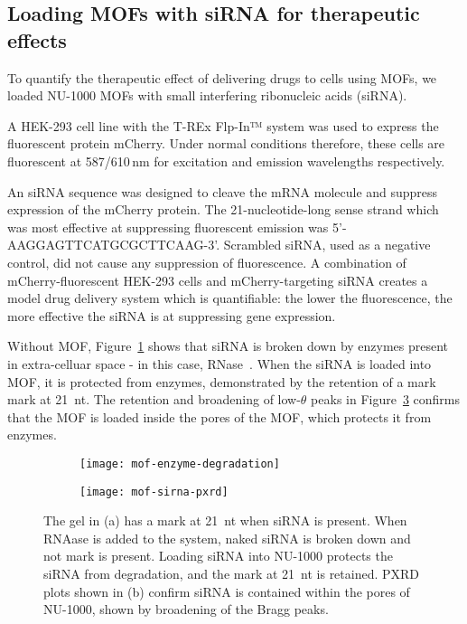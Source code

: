 \subsection{Loading MOFs with siRNA for therapeutic effects} \label{sec:MOF-siRNA}
To quantify the therapeutic effect of delivering drugs to cells using MOFs, we loaded NU-1000 MOFs with small interfering ribonucleic acids (siRNA). 

A HEK-293 cell line with the T-REx Flp-In™ system was used to express the fluorescent protein mCherry. 
Under normal conditions therefore, these cells are fluorescent at 587/610\,\si{\nano\meter} for excitation and emission wavelengths respectively. 

An siRNA sequence was designed to cleave the mRNA molecule and suppress expression of the mCherry protein.
The 21-nucleotide-long sense strand which was most effective at suppressing fluorescent emission was 5'-AAGGAGTTCATGCGCTTCAAG-3'. 
Scrambled siRNA, used as a negative control, did not cause any suppression of fluorescence.
A combination of mCherry-fluorescent HEK-293 cells and mCherry-targeting siRNA creates a model drug delivery system which is quantifiable: the lower the fluorescence, the more effective the siRNA is at suppressing gene expression. 

Without MOF, Figure~\ref{fig:mof-enzyme-degradation} shows that siRNA is broken down by enzymes present in extra-celluar space - in this case, RNase~\cite{chirgwin1979isolation}.
When the siRNA is loaded into MOF, it is protected from enzymes, demonstrated by the retention of a mark mark at \SI{21}{nt}. 
The retention and broadening of low-$\theta$ peaks in Figure~\ref{fig:mof-enzyme-pxrd} confirms that the MOF is loaded inside the pores of the MOF, which protects it from enzymes. 

\begin{figure}[htbp!]
	\centering
	\begin{subfigure}[b]{0.49\textwidth}
		\texttt{[image: mof-enzyme-degradation]}
		\caption{} \label{fig:mof-enzyme-degradation}
	\end{subfigure}
	\hfill
	\begin{subfigure}[b]{0.49\textwidth}
		\texttt{[image: mof-sirna-pxrd]}
		\caption{} \label{fig:mof-sirna-pxrd}
	\end{subfigure}			
	\caption[MOFs: NU-1000 protects siRNA from degradation by enzymes in extracellular space]{The gel in (a) has a mark at \SI{21}{nt} when siRNA is present. When RNAase is added to the system, naked siRNA is broken down and not mark is present. Loading siRNA into NU-1000 protects the siRNA from degradation, and the mark at \SI{21}{nt} is retained. PXRD plots shown in (b) confirm siRNA is contained within the pores of NU-1000, shown by broadening of the Bragg peaks.}
\label{fig:mof-enzyme-pxrd}
\end{figure}

